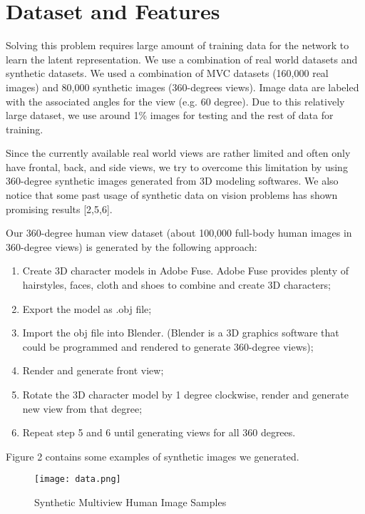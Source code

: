 \documentclass[10pt,conference]{IEEEtran}
\begin{document}
\section{Dataset and Features}
Solving this problem requires large amount of training data for the network to learn the latent representation. We use a combination of real world datasets and synthetic datasets. We used a combination of MVC datasets (160,000 real images) and 80,000 synthetic images (360-degrees views). Image data are labeled with the associated angles for the view (e.g. 60 degree). Due to this relatively large dataset, we use around 1\% images for testing and the rest of data for training.

Since the currently available real world views are rather limited and often only have frontal, back, and side views, we try to overcome this limitation by using 360-degree synthetic images generated from 3D modeling softwares. We also notice that some past usage of synthetic data on vision problems has shown promising results [2,5,6].

Our 360-degree human view dataset (about 100,000 full-body human images in 360-degree views) is generated by the following approach:
\renewcommand{\labelenumi}{\roman{enumi}}
 \begin{enumerate}
   \item Create 3D character models in Adobe Fuse. Adobe Fuse provides plenty of hairstyles, faces, cloth and shoes to combine and create 3D characters;
   \item Export the model as .obj file;
   \item Import the obj file into Blender. (Blender is a 3D graphics software that could be programmed and rendered to generate 360-degree views);
   \item Render and generate front view;
   \item Rotate the 3D character model by 1 degree clockwise, render and generate new view from that degree;
   \item Repeat step 5 and 6 until generating views for all 360 degrees.   
 \end{enumerate}

Figure 2 contains some examples of synthetic images we generated.

\begin{figure}[htbp]
\centering
\texttt{[image: data.png]}
\caption{Synthetic Multiview Human Image Samples}
\end{figure}
\end{document}
